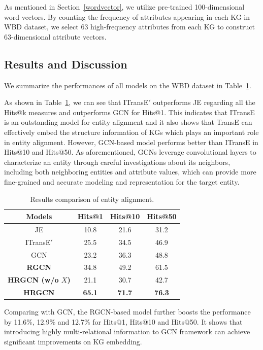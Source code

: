 	As mentioned in Section~\ref{wordvector}, we utilize pre-trained 100-dimensional word vectors. By counting the frequency of attributes appearing in each KG in WBD dataset, we select 63 high-frequency attributes from each KG to construct 63-dimensional attribute vectors.
	
	\subsection{Results and Discussion}
	
	We summarize the performances of all models on the WBD dataset in Table~\ref{f1}.
	
	As shown in Table~\ref{f1}, we can see that ITransE$'$ outperforms JE regarding all the Hits@k measures and outperforms GCN for Hits@1. This indicates that ITransE is an outstanding model for entity alignment and it also shows that TransE can effectively embed the structure information of KGs which plays an important role in entity alignment. However, GCN-based model performs better than ITransE in Hits@10 and Hits@50. As aforementioned, GCNs leverage convolutional layers to characterize an entity through careful investigations about its neighbors, including both neighboring entities and attribute values, which can provide more fine-grained and accurate modeling and representation for the target entity.
	\begin{table}
		\centering
		\begin{tabular}{cccc}
			\toprule
			\bf Models & Hits@1 & Hits@10 & Hits@50 \\
			\midrule
			JE & 10.8 & 21.6 & 31.2 \\
			ITransE$'$ & 25.5 & 34.5 & 46.9 \\
			GCN & 23.2 & 36.3 & 48.8 \\
			\bf RGCN & 34.8 & 49.2 & 61.5 \\
			\bf HRGCN (w/o $X$) & 21.1 & 30.7 & 42.7  \\
			\bf HRGCN & \bf 65.1 & \bf 71.7 & \bf 76.3 \\
			\bottomrule
		\end{tabular}
		\caption{Results comparison of entity alignment.}
		\label{f1}
	\end{table}
	Comparing with GCN, the RGCN-based model further boosts the performance by 11.6\%, 12.9\% and 12.7\% for Hits@1, Hits@10 and Hits@50. It shows that introducing highly multi-relational information to GCN framework can achieve significant improvements on KG embedding.
	
